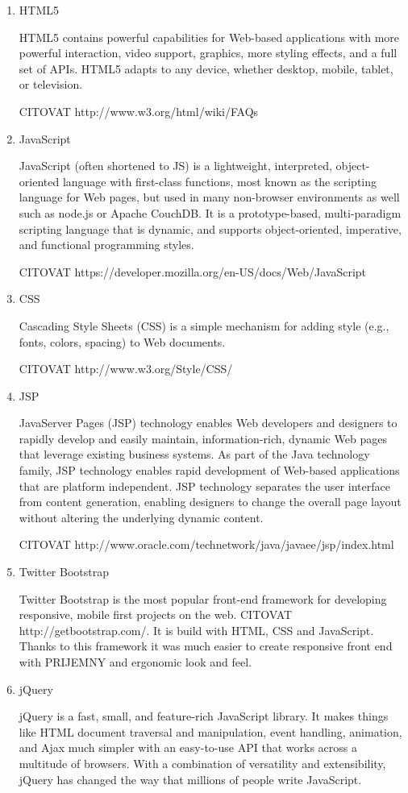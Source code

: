 \documentclass[thesis=B,english]{FITthesis}[2012/10/20]
\begin{document}
\begin{enumerate}

\item{HTML5}

HTML5 contains powerful capabilities for Web-based applications with more powerful interaction, video support, graphics, more styling effects, and a full set of APIs. HTML5 adapts to any device, whether desktop, mobile, tablet, or television.

CITOVAT http://www.w3.org/html/wiki/FAQs

\item{JavaScript}

JavaScript (often shortened to JS) is a lightweight, interpreted, object-oriented language with first-class functions, most known as the scripting language for Web pages, but used in many non-browser environments as well such as node.js or Apache CouchDB. It is a prototype-based, multi-paradigm scripting language that is dynamic, and supports object-oriented, imperative, and functional programming styles.

CITOVAT https://developer.mozilla.org/en-US/docs/Web/JavaScript
\item{CSS}

Cascading Style Sheets (CSS) is a simple mechanism for adding style (e.g., fonts, colors, spacing) to Web documents.

CITOVAT http://www.w3.org/Style/CSS/

\item{JSP}

JavaServer Pages (JSP) technology enables Web developers and designers to rapidly develop and easily maintain, information-rich, dynamic Web pages that leverage existing business systems. As part of the Java technology family, JSP technology enables rapid development of Web-based applications that are platform independent. JSP technology separates the user interface from content generation, enabling designers to change the overall page layout without altering the underlying dynamic content.

CITOVAT http://www.oracle.com/technetwork/java/javaee/jsp/index.html

\item{Twitter Bootstrap}

Twitter Bootstrap is the most popular front-end framework for developing responsive, mobile first projects on the web. CITOVAT http://getbootstrap.com/. It is build with HTML, CSS and JavaScript. Thanks to this framework it was much easier to create responsive front end with PRIJEMNY  and ergonomic look and feel.

\item{jQuery}

jQuery is a fast, small, and feature-rich JavaScript library. It makes things like HTML document traversal and manipulation, event handling, animation, and Ajax much simpler with an easy-to-use API that works across a multitude of browsers. With a combination of versatility and extensibility, jQuery has changed the way that millions of people write JavaScript.
\cite{JJ92}

\end{enumerate}
\end{document}
